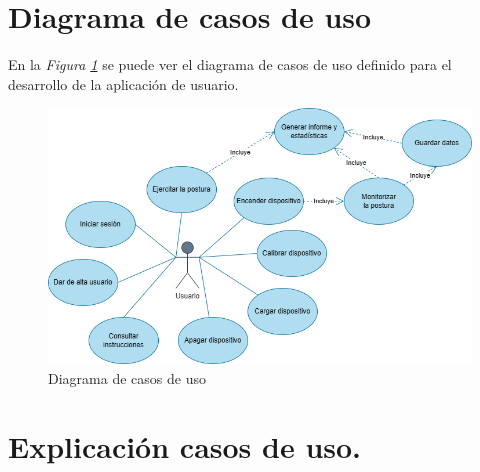 

\section{Diagrama de casos de uso}
En la \textit{Figura \ref{fig:Casosuso}} se puede ver el diagrama de casos de uso definido para el desarrollo de la aplicación de usuario.

\begin{figure}[h]
    \centering
    \includegraphics[width=1\textwidth]{img/DiagramaCasosDeUso.png}
    \caption{Diagrama de casos de uso}
    \label{fig:Casosuso} 
\end{figure}

\section{Explicación casos de uso.}


